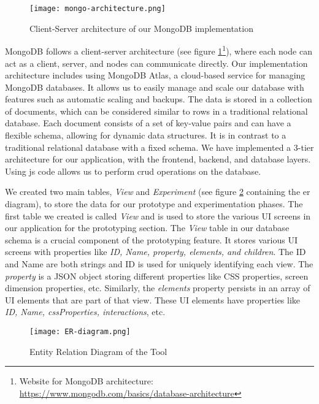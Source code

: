 \begin{figure}[ht]
    \centering
    \texttt{[image: mongo-architecture.png]}
    \caption[MongoDB Architecture]{Client-Server architecture of our MongoDB implementation\footnotemark[14]}
    \label{implementation:fig:mongoarchitecture}
\end{figure}

MongoDB follows a client-server architecture (see figure \ref{implementation:fig:mongoarchitecture}\footnote{Website for MongoDB architecture: \url{https://www.mongodb.com/basics/database-architecture}}), where each node can act as a client, server, and nodes can communicate directly.
Our implementation architecture includes using MongoDB Atlas, a cloud-based service for managing MongoDB databases. It allows us to easily manage and scale our database with features such as automatic scaling and backups.
The data is stored in a collection of documents, which can be considered similar to rows in a traditional relational database. Each document consists of a set of key-value pairs and can have a flexible schema, allowing for dynamic data structures. It is in contrast to a traditional relational database with a fixed schema.
We have implemented a 3-tier architecture for our application, with the frontend, backend, and database layers. 
Using \ac{js} code allows us to perform \ac{crud} operations on the database.

We created two main tables, \textit{View} and \textit{Experiment} (see figure \ref{implementation:fig:erdb} containing the \ac{er} diagram), to store the data for our prototype and experimentation phases. 
The first table we created is called \textit{View} and is used to store the various UI screens in our application for the prototyping section. 
The \textit{View} table in our database schema is a crucial component of the prototyping feature. 
It stores various UI screens with properties like \textit{ID, Name, property, elements, and children}. 
The ID and Name are both strings and ID is used for uniquely identifying each view. 
The \textit{property} is a JSON object storing different properties like CSS properties, screen dimension properties, etc. 
Similarly, the \textit{elements} property persists in an array of UI elements that are part of that view. 
These UI elements have properties like \textit{ID, Name, cssProperties, interactions}, etc.

\begin{figure}[ht]
    \centering
    \texttt{[image: ER-diagram.png]}
    \caption[Entity Relation Diagram]{Entity Relation Diagram of the Tool}
    \label{implementation:fig:erdb}
\end{figure}

